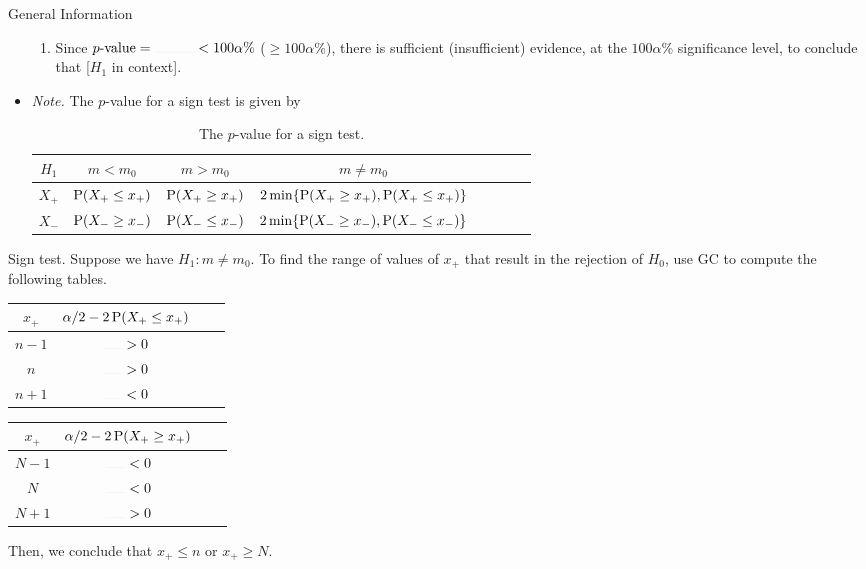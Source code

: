\documentclass[../Notes.tex]{subfiles}
\begin{document}
\begin{stbox}{General Information}
\begin{itemize}
\begin{enumerate}
      \item Since \(p\text{-value}=\rule{1cm}{0.01mm}<100\alpha\%\) (\(\geq 100\alpha\%\)), there is sufficient (insufficient) evidence, at the \(100\alpha\%\) significance level, to conclude that [\(H_1\) in context].
    \end{enumerate}
    \item \emph{Note.} The \(p\)-value for a sign test is given by
    \begin{table}[H]
      \centering
      \begin{tabular}{ScScScSc}
        \toprule
        \(H_1\) & \(m<m_0\) & \(m>m_0\) & \(m\neq m_0\)\\
        \midrule
        \(X_{+}\) & \(\operatorname{P}(X_{+}\leq x_{+})\) & \(\operatorname{P}(X_{+}\geq x_{+})\) & \(2\min\{\operatorname{P}(X_{+}\geq x_{+}),\operatorname{P}(X_{+}\leq x_{+})\}\)\\
        \midrule
        \(X_{-}\) & \(\operatorname{P}(X_{-}\geq x_{-})\) & \(\operatorname{P}(X_{-}\leq x_{-})\) & \(2\min\{\operatorname{P}(X_{-}\geq x_{-}),\operatorname{P}(X_{-}\leq x_{-})\}\)\\
        \bottomrule
      \end{tabular}
      \caption{The \(p\)-value for a sign test.}
      \label{table:sign-test-p-value}
    \end{table}
  \end{itemize}
\end{stbox}
\begin{note}
  Sign test. Suppose we have \(H_1\colon m\neq m_0\). To find the range of values of \(x_{+}\) that result in the rejection of \(H_0\), use GC to compute the following tables.
  \begin{table}[H]
    \centering
    \begin{tabular}{|Sc|Sc|}
      \hline
      \(x_{+}\) & \(\alpha/2-2\operatorname{P}(X_{+}\leq x_{+})\)\\
      \hline
      \(n-1\) & \(\rule{0.5cm}{0.01mm}>0\)\\
      \hline
      \(n\) & \(\rule{0.5cm}{0.01mm}>0\)\\
      \hline
      \(n+1\) & \(\rule{0.5cm}{0.01mm}<0\)\\
      \hline
    \end{tabular}\hspace{1cm}
    \begin{tabular}{|Sc|Sc|}
      \hline
      \(x_{+}\) & \(\alpha/2-2\operatorname{P}(X_{+}\geq x_{+})\)\\
      \hline
      \(N-1\) & \(\rule{0.5cm}{0.01mm}<0\)\\
      \hline
      \(N\) & \(\rule{0.5cm}{0.01mm}<0\)\\
      \hline
      \(N+1\) & \(\rule{0.5cm}{0.01mm}>0\)\\
      \hline
    \end{tabular} 
  \end{table}
  Then, we conclude that \(x_{+}\leq n\) or \(x_{+}\geq N\).
\end{note}
\end{document}
